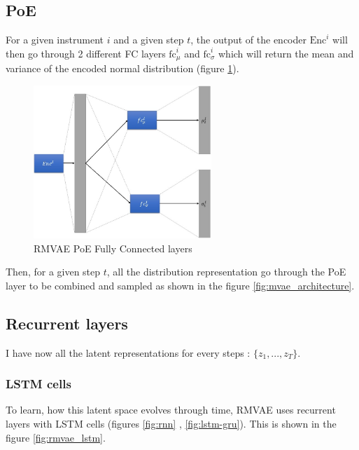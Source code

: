 \documentclass[12pt]{report}
\begin{document}
\subsection{PoE}

For a given instrument $i$ and a given step $t$, the output of the encoder $\text{Enc}^i$ will then go through 2 different FC layers $\text{fc}^i_\mu$ and $\text{fc}^i_\sigma$ which will return the mean and variance of the encoded normal distribution (figure \ref{fig:rmvae_poe_fc}).

\begin{figure}[h]
    \centering
    \includegraphics[width=0.6\textwidth]{images/nn/architectures/rmvae/poe_fc.jpg}
    \caption{RMVAE PoE Fully Connected layers}
    \label{fig:rmvae_poe_fc}
\end{figure}

Then, for a given step $t$, all the distribution representation go through the PoE layer to be combined and sampled as shown in the figure \ref{fig:mvae_architecture}.

\subsection{Recurrent layers}

I have now all the latent representations for every steps : $\{z_1, ..., z_T\}$.

\subsubsection{LSTM cells}

To learn, how this latent space evolves through time, RMVAE uses recurrent layers with LSTM cells (figures \ref{fig:rnn} , \ref{fig:lstm-gru}).
This is shown in the figure \ref{fig:rmvae_lstm}.
\end{document}
